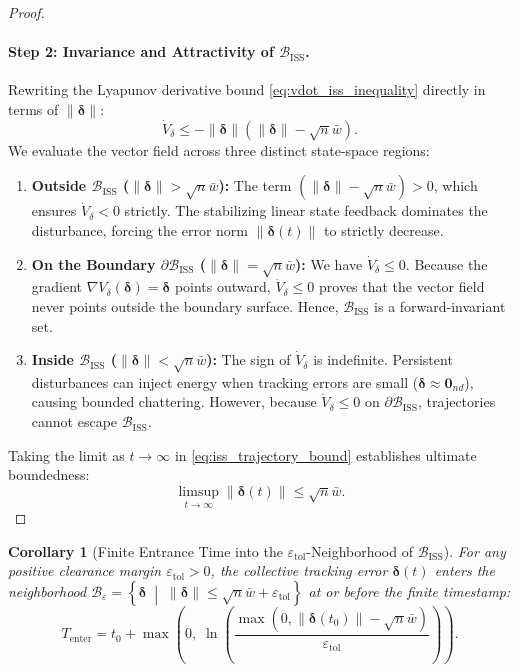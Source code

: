 \documentclass[11pt]{article}
\newtheorem{corollary}{Corollary}
\begin{document}
\begin{proof}
\paragraph{Step 2: Invariance and Attractivity of $\mathcal{B}_{\text{ISS}}$.}
Rewriting the Lyapunov derivative bound \eqref{eq:vdot_iss_inequality} directly in terms of $\|\boldsymbol{\delta}\|$:
\begin{equation}
\dot{V}_\delta \le -\|\boldsymbol{\delta}\| \left( \|\boldsymbol{\delta}\| - \sqrt{n}\bar{w} \right).
\end{equation}
We evaluate the vector field across three distinct state-space regions:
\begin{enumerate}
    \item \textbf{Outside $\mathcal{B}_{\text{ISS}}$ ($\|\boldsymbol{\delta}\| > \sqrt{n}\bar{w}$):} The term $(\|\boldsymbol{\delta}\| - \sqrt{n}\bar{w}) > 0$, which ensures $\dot{V}_\delta < 0$ strictly. The stabilizing linear state feedback dominates the disturbance, forcing the error norm $\|\boldsymbol{\delta}(t)\|$ to strictly decrease.
    \item \textbf{On the Boundary $\partial\mathcal{B}_{\text{ISS}}$ ($\|\boldsymbol{\delta}\| = \sqrt{n}\bar{w}$):} We have $\dot{V}_\delta \le 0$. Because the gradient $\nabla V_\delta(\boldsymbol{\delta}) = \boldsymbol{\delta}$ points outward, $\dot{V}_\delta \le 0$ proves that the vector field never points outside the boundary surface. Hence, $\mathcal{B}_{\text{ISS}}$ is a forward-invariant set.
    \item \textbf{Inside $\mathcal{B}_{\text{ISS}}$ ($\|\boldsymbol{\delta}\| < \sqrt{n}\bar{w}$):} The sign of $\dot{V}_\delta$ is indefinite. Persistent disturbances can inject energy when tracking errors are small ($\boldsymbol{\delta} \approx \mathbf{0}_{nd}$), causing bounded chattering. However, because $\dot{V}_\delta \le 0$ on $\partial\mathcal{B}_{\text{ISS}}$, trajectories cannot escape $\mathcal{B}_{\text{ISS}}$.
\end{enumerate}
Taking the limit as $t \to \infty$ in \eqref{eq:iss_trajectory_bound} establishes ultimate boundedness:
\begin{equation}
\limsup_{t \to \infty} \|\boldsymbol{\delta}(t)\| \le \sqrt{n}\bar{w}.
\end{equation}
\end{proof}

\begin{corollary}[Finite Entrance Time into the $\varepsilon_{\text{tol}}$-Neighborhood of $\mathcal{B}_{\text{ISS}}$]
For any positive clearance margin $\varepsilon_{\text{tol}} > 0$, the collective tracking error $\boldsymbol{\delta}(t)$ enters the neighborhood $\mathcal{B}_{\varepsilon} = \left\{ \boldsymbol{\delta} \;\middle|\; \|\boldsymbol{\delta}\| \le \sqrt{n}\bar{w} + \varepsilon_{\text{tol}} \right\}$ at or before the finite timestamp:
\begin{equation}
T_{\text{enter}} = t_0 + \max\left(0, \; \ln\left(\frac{\max(0, \|\boldsymbol{\delta}(t_0)\| - \sqrt{n}\bar{w})}{\varepsilon_{\text{tol}}}\right)\right).
\label{eq:t_enter}
\end{equation}
\end{corollary}
\end{document}
